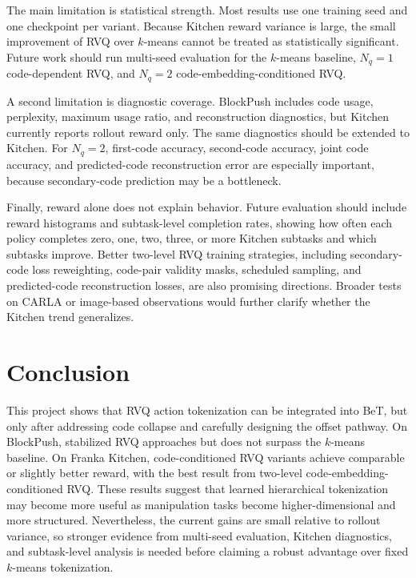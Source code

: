 \documentclass[conference]{IEEEtran}
\begin{document}
The main limitation is statistical strength. Most results use one training seed and one checkpoint per variant. Because Kitchen reward variance is large, the small improvement of RVQ over $k$-means cannot be treated as statistically significant. Future work should run multi-seed evaluation for the $k$-means baseline, $N_q{=}1$ code-dependent RVQ, and $N_q{=}2$ code-embedding-conditioned RVQ.

A second limitation is diagnostic coverage. BlockPush includes code usage, perplexity, maximum usage ratio, and reconstruction diagnostics, but Kitchen currently reports rollout reward only. The same diagnostics should be extended to Kitchen. For $N_q{=}2$, first-code accuracy, second-code accuracy, joint code accuracy, and predicted-code reconstruction error are especially important, because secondary-code prediction may be a bottleneck.

Finally, reward alone does not explain behavior. Future evaluation should include reward histograms and subtask-level completion rates, showing how often each policy completes zero, one, two, three, or more Kitchen subtasks and which subtasks improve. Better two-level RVQ training strategies, including secondary-code loss reweighting, code-pair validity masks, scheduled sampling, and predicted-code reconstruction losses, are also promising directions. Broader tests on CARLA or image-based observations would further clarify whether the Kitchen trend generalizes.

\section{Conclusion}

This project shows that RVQ action tokenization can be integrated into BeT, but only after addressing code collapse and carefully designing the offset pathway. On BlockPush, stabilized RVQ approaches but does not surpass the $k$-means baseline. On Franka Kitchen, code-conditioned RVQ variants achieve comparable or slightly better reward, with the best result from two-level code-embedding-conditioned RVQ. These results suggest that learned hierarchical tokenization may become more useful as manipulation tasks become higher-dimensional and more structured. Nevertheless, the current gains are small relative to rollout variance, so stronger evidence from multi-seed evaluation, Kitchen diagnostics, and subtask-level analysis is needed before claiming a robust advantage over fixed $k$-means tokenization.
\end{document}
